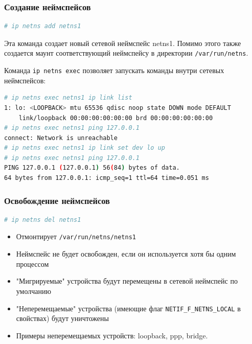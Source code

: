 \begin{frame}[fragile, label={net_ns_create}]
\frametitle{Создание неймспейсов}
\begin{block}{}
\begin{lstlisting}[language=bash, basicstyle={\fontsize{8}{8}\ttfamily}]
# ip netns add netns1
\end{lstlisting}
    Эта команда создает новый сетевой неймспейс \alert{netns1}. Помимо этого также создается маунт соответствующий неймспейсу в директории \texttt{/var/run/netns}. 
    
    Команда \texttt{ip netns exec} позволяет запускать команды внутри сетевых неймспейсов:
\begin{lstlisting}[language=bash, basicstyle={\fontsize{8}{8}\ttfamily}]
# ip netns exec netns1 ip link list
1: lo: <LOOPBACK> mtu 65536 qdisc noop state DOWN mode DEFAULT 
    link/loopback 00:00:00:00:00:00 brd 00:00:00:00:00:00
# ip netns exec netns1 ping 127.0.0.1
connect: Network is unreachable
# ip netns exec netns1 ip link set dev lo up
# ip netns exec netns1 ping 127.0.0.1
PING 127.0.0.1 (127.0.0.1) 56(84) bytes of data.
64 bytes from 127.0.0.1: icmp_seq=1 ttl=64 time=0.051 ms
\end{lstlisting}
\end{block}

\end{frame}

\begin{frame}[fragile, label={net_ns_delete}]
\frametitle{Освобождение неймспейсов}
\begin{block}{}
\begin{lstlisting}[language=bash, basicstyle={\fontsize{8}{8}\ttfamily}]
# ip netns del netns1
\end{lstlisting}
\begin{itemize}
    \item Отмонтирует \texttt{/var/run/netns/netns1}
    \item Неймспейс не будет освобожден, если он используется хотя бы одним процессом
    \item "Мигрируемые"{} устройства будут перемещены в сетевой неймспейс по умолчанию
    \item "Неперемещаемые"{} устройства (имеющие флаг \texttt{NETIF\_F\_NETNS\_LOCAL} в свойствах) будут уничтожены
    \item Примеры неперемещаемых устройств: loopback, ppp, bridge.
\end{itemize}
\end{block}
\end{frame}

